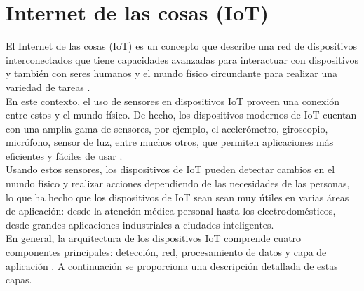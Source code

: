 \section{Internet de las cosas (IoT)}	
	El Internet de las cosas (IoT) es un concepto que describe una red de dispositivos interconectados que tiene capacidades avanzadas para interactuar con dispositivos y también con seres humanos y el mundo físico circundante para realizar una variedad de tareas \cite{vermesanIoT}.\\
	
	En este contexto, el uso de sensores en dispositivos IoT proveen una conexión entre estos y el mundo físico. De hecho, los dispositivos modernos de IoT cuentan con una amplia gama de sensores, por ejemplo, el acelerómetro, giroscopio, micrófono, sensor de luz, entre muchos otros, que permiten aplicaciones más eficientes y fáciles de usar \cite{laneIoT}. \\
	
	Usando estos sensores, los dispositivos de IoT pueden detectar cambios en el mundo físico y realizar acciones dependiendo de las necesidades de las personas, lo que ha hecho que los dispositivos de IoT sean sean muy útiles en varias áreas de aplicación: desde la atención médica personal hasta los electrodomésticos, desde grandes aplicaciones industriales a ciudades inteligentes. \\
	
	En general, la arquitectura de los dispositivos IoT comprende cuatro componentes principales: detección, red, procesamiento de datos y capa de aplicación \cite{arquitecturaIoT}. A continuación se proporciona una descripción detallada de estas capas.
	

